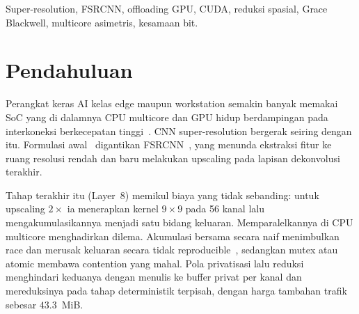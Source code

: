 \documentclass[conference]{IEEEtran}
\begin{document}
\begin{IEEEkeywords}
Super-resolution, FSRCNN, offloading GPU, CUDA, reduksi spasial, Grace Blackwell, multicore asimetris, kesamaan bit.
\end{IEEEkeywords}

\section{Pendahuluan}

Perangkat keras AI kelas edge maupun workstation semakin banyak memakai SoC yang di dalamnya CPU multicore dan GPU hidup berdampingan pada interkoneksi berkecepatan tinggi~\cite{nvidiagracehopper2022,wahlgren2025upm}. CNN super-resolution bergerak seiring dengan itu. Formulasi awal~\cite{dong2014srcnn} digantikan FSRCNN~\cite{dong2016fsrcnn}, yang menunda ekstraksi fitur ke ruang resolusi rendah dan baru melakukan upscaling pada lapisan dekonvolusi terakhir.

Tahap terakhir itu (Layer~8) memikul biaya yang tidak sebanding: untuk upscaling $2\times$ ia menerapkan kernel $9{\times}9$ pada 56 kanal lalu mengakumulasikannya menjadi satu bidang keluaran. Memparalelkannya di CPU multicore menghadirkan dilema. Akumulasi bersama secara naif menimbulkan race dan merusak keluaran secara tidak reproducible~\cite{annisa2025}, sedangkan mutex atau atomic membawa contention yang mahal. Pola privatisasi lalu reduksi menghindari keduanya dengan menulis ke buffer privat per kanal dan mereduksinya pada tahap deterministik terpisah, dengan harga tambahan trafik sebesar $43.3$~MiB.
\end{document}
